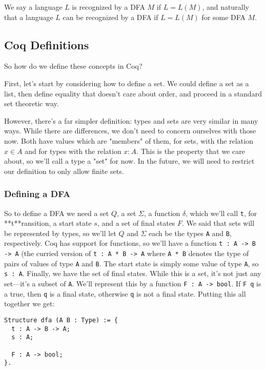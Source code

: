 We say a language $L$ is recognized by a DFA $M$ if $L = L(M)$, and naturally that a language $L$ can be recognized by a DFA if $L = L(M)$ for some DFA $M$.

\subsection{Coq Definitions}

So how do we define these concepts in Coq?

First, let's start by considering how to define a set.
We could define a set as a list, then define equality that doesn't care about order, and proceed in a standard set theoretic way.

However, there's a far simpler definition: types and sets are very similar in many ways.
While there are differences, we don't need to concern ourselves with those now.
Both have values which are "members" of them, for sets, with the relation $x \in A$ and for types with the relation $x : A$.
This is the property that we care about, so we'll call a type a "set" for now.
In the future, we will need to restrict our definition to only allow finite sets.

\subsubsection{Defining a DFA}

So to define a DFA we need a set $Q$, a set $\Sigma$, a function $\delta$, which we'll call \texttt{t}, for **t**ransition, a start state $s$, and a set of final states $F$.
We said that sets will be represented by types, so we'll let $Q$ and $\Sigma$ each be the types \texttt{A} and \texttt{B}, respectively.
Coq has support for functions, so we'll have a function \texttt{t : A -> B -> A} (the curried version of \texttt{t : A * B -> A} where \texttt{A * B} denotes the type of pairs of values of type \texttt{A} and \texttt{B}.
The start state is simply some value of type \texttt{A}, so \texttt{s : A}.
Finally, we have the set of final states.
While this is a set, it's not just any set---it's a subset of \texttt{A}.
We'll represent this by a function \texttt{F : A -> bool}.
If \texttt{F q} is a true, then \texttt{q} is a final state, otherwise \texttt{q} is not a final state.
Putting this all together we get:

\begin{verbatim}
Structure dfa (A B : Type) := {
  t : A -> B -> A;
  s : A;

  F : A -> bool;
}.
\end{verbatim}

